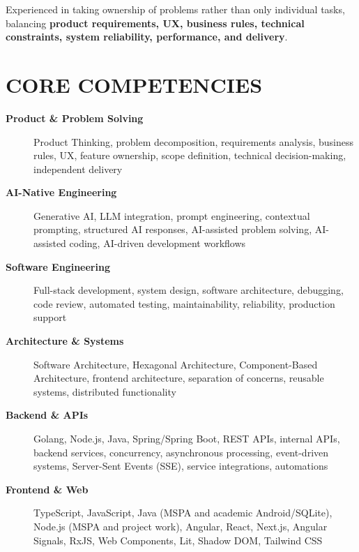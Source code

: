 \documentclass[10pt,a4paper]{article}
\begin{document}
Experienced in taking ownership of problems rather than only
individual tasks, balancing \textbf{product requirements, UX,
business rules, technical constraints, system reliability,
performance, and delivery}.


\section*{CORE COMPETENCIES}

\footnotesize

\begin{description}

    \item[\textbf{Product \& Problem Solving}]
    Product Thinking, problem decomposition, requirements analysis,
    business rules, UX, feature ownership, scope definition,
    technical decision-making, independent delivery

    \item[\textbf{AI-Native Engineering}]
    Generative AI, LLM integration, prompt engineering,
    contextual prompting, structured AI responses,
    AI-assisted problem solving, AI-assisted coding,
    AI-driven development workflows

    \item[\textbf{Software Engineering}]
    Full-stack development, system design, software architecture,
    debugging, code review, automated testing,
    maintainability, reliability, production support

    \item[\textbf{Architecture \& Systems}]
    Software Architecture, Hexagonal Architecture,
    Component-Based Architecture, frontend architecture,
    separation of concerns, reusable systems,
    distributed functionality

    \item[\textbf{Backend \& APIs}]
    Golang, Node.js, Java, Spring/Spring Boot, REST APIs, internal APIs, backend services,
    concurrency, asynchronous processing, event-driven systems,
    Server-Sent Events (SSE), service integrations, automations

    \item[\textbf{Frontend \& Web}]
    TypeScript, JavaScript, Java (MSPA and academic Android/SQLite), Node.js (MSPA and project work), Angular, React, Next.js,
    Angular Signals, RxJS, Web Components, Lit,
    Shadow DOM, Tailwind CSS


\end{description}
\end{document}
